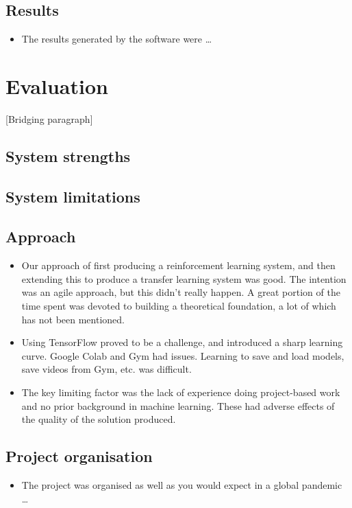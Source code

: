 \documentclass[12pt,a4paper]{article}
\begin{document}
\subsection{Results}
\begin{itemize}
    \item The results generated by the software were \dots
\end{itemize}

\newpage
\section{Evaluation}
[Bridging paragraph]
\subsection{System strengths} 

\subsection{System limitations}

\subsection{Approach}
\begin{itemize}
    \item Our approach of first producing a reinforcement learning system, and then extending this to produce a transfer learning system was good. The intention was an agile approach, but this didn't really happen. A great portion of the time spent was devoted to building a theoretical foundation, a lot of which has not been mentioned.
    \item Using TensorFlow proved to be a challenge, and introduced a sharp
    learning curve. Google Colab and Gym had issues. Learning to save and load models, save videos from Gym, etc. was difficult. 
    \item The key limiting factor was the lack of experience doing project-based work and no prior background in machine learning. These had adverse effects of the quality of the solution produced.
\end{itemize}

\subsection{Project organisation}
\begin{itemize}
    \item The project was organised as well as you would expect in a global pandemic \dots
\end{itemize}
\end{document}
